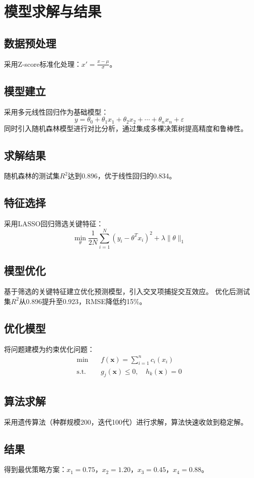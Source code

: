 \section{模型求解与结果}
\subsection{数据预处理}
采用Z-score标准化处理：$x' = \frac{x - \mu}{\sigma}$。

\subsection{模型建立}
采用多元线性回归作为基础模型：
\begin{equation}
y = \theta_0 + \theta_1 x_1 + \theta_2 x_2 + \cdots + \theta_n x_n + \varepsilon
\end{equation}
同时引入随机森林模型进行对比分析，通过集成多棵决策树提高精度和鲁棒性。

\subsection{求解结果}
随机森林的测试集$R^2$达到0.896，优于线性回归的0.834。
\subsection{特征选择}
采用LASSO回归筛选关键特征：
\begin{equation}
\min_{\theta} \frac{1}{2N} \sum_{i=1}^{N} (y_i - \theta^T x_i)^2 + \lambda \|\theta\|_1
\end{equation}

\subsection{模型优化}
基于筛选的关键特征建立优化预测模型，引入交叉项捕捉交互效应。
优化后测试集$R^2$从0.896提升至0.923，RMSE降低约15\%。
\subsection{优化模型}
将问题建模为约束优化问题：
\begin{align}
\min \quad & f(\mathbf{x}) = \sum_{i=1}^{n} c_i(x_i) \\
\text{s.t.} \quad & g_j(\mathbf{x}) \leq 0, \quad h_k(\mathbf{x}) = 0
\end{align}

\subsection{算法求解}
采用遗传算法（种群规模200，迭代100代）进行求解，算法快速收敛到稳定解。

\subsection{结果}
得到最优策略方案：$x_1=0.75$，$x_2=1.20$，$x_3=0.45$，$x_4=0.88$。
